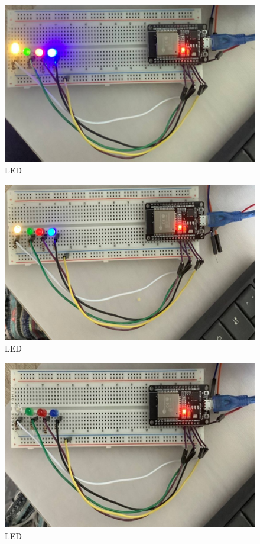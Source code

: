 \documentclass[conference]{IEEEtran}
\begin{document}
\begin{figure}[htbp]
\centerline{\includegraphics{image7.png}}
\caption{LED}
\label{fig}
\end{figure}




\begin{figure}[htbp]
\centerline{\includegraphics{image8.png}}
\caption{LED}
\label{fig}
\end{figure}


\begin{figure}[htbp]
\centerline{\includegraphics{image9.png}}
\caption{LED}
\label{fig}
\end{figure}
\end{document}
